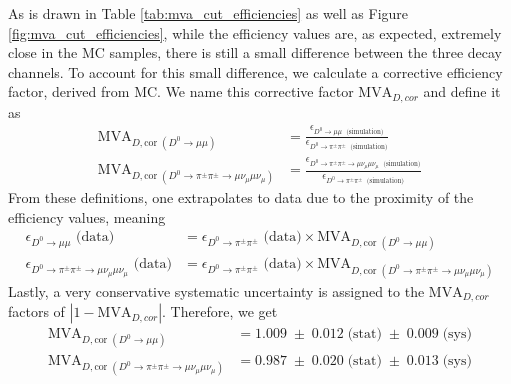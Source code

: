 As is drawn in Table \ref{tab:mva_cut_efficiencies} as well as Figure \ref{fig:mva_cut_efficiencies}, while the efficiency values are, as expected, extremely close in the MC samples, there is still a small difference between the three decay channels. To account for this small difference, we calculate a corrective efficiency factor, derived from MC. We name this corrective factor $\text{MVA}_{D, cor}$ and define it as
\begin{equation}
    \begin{split}
    \text{MVA}_{D,\text{cor}\;(D^0 \to \mu \mu)} &= 
    \frac{\epsilon_{D^0 \to \mu \mu\; \text{ (simulation)}}}
         {\epsilon_{D^0 \to \pi^\pm \pi^\pm\; \text{ (simulation)}}} \\
    \text{MVA}_{D,\text{cor}\;(D^0 \to \pi^\pm \pi^\pm \to \mu \nu_\mu \mu \nu_\mu)} &= 
    \frac{\epsilon_{D^0 \to \pi^\pm \pi^\pm \to \mu \nu_\mu \mu \nu_\mu\; \text{ (simulation)}}}
         {\epsilon_{D^0 \to \pi^\pm \pi^\pm\; \text{ (simulation)}}}
    \end{split}
\end{equation}
From these definitions, one extrapolates to data due to the proximity of the efficiency values, meaning
\begin{equation}
    \begin{split}
    \epsilon_{D^0 \to \mu \mu} \text{ (data)} &= 
    \epsilon_{D^0 \to \pi^\pm \pi^\pm} \text{ (data)} 
    \times \text{MVA}_{D,\text{cor}\;(D^0 \to \mu \mu)} \\
    \epsilon_{D^0 \to \pi^\pm \pi^\pm \to \mu \nu_\mu \mu \nu_\mu} \text{ (data)} &= 
    \epsilon_{D^0 \to \pi^\pm \pi^\pm} \text{ (data)} 
    \times \text{MVA}_{D,\text{cor}\;(D^0 \to \pi^\pm \pi^\pm \to \mu \nu_\mu \mu \nu_\mu)}
    \end{split}
\end{equation}
Lastly, a very conservative systematic uncertainty is assigned to the $\text{MVA}_{D, cor}$ factors of $|1-\text{MVA}_{D, cor}|$. Therefore, we get
\begin{equation}
\begin{split}
    \text{MVA}_{D,\text{cor}\;(D^0 \to \mu \mu)} &= 1.009\;\pm\;0.012 \; \text{(stat)}\;\pm\;0.009 \; \text{(sys)} \\
    \text{MVA}_{D,\text{cor}\;(D^0 \to \pi^\pm \pi^\pm \to \mu \nu_\mu \mu \nu_\mu)} &= 0.987\;\pm\;0.020 \; \text{(stat)}\;\pm\;0.013 \; \text{(sys)}
\end{split}
\end{equation}
    
